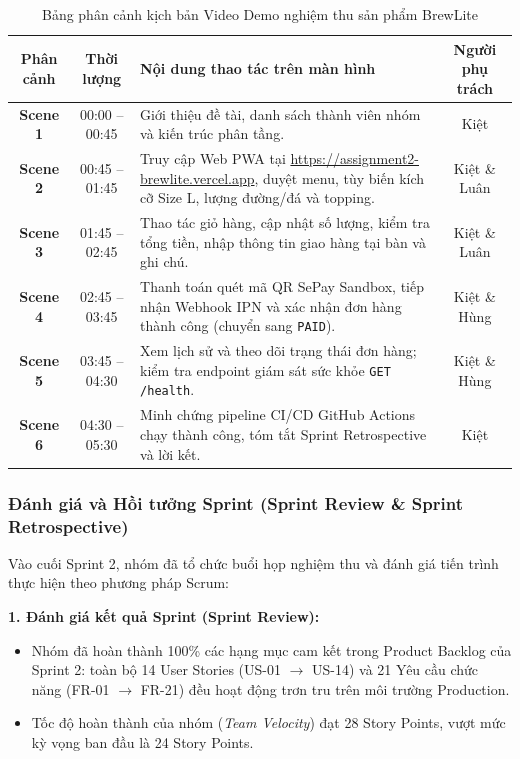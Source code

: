 \documentclass[a4paper]{article}
\begin{document}
\begin{table}[H]
\centering
\small
\begin{tabularx}{\textwidth}{|c|c|X|c|}
\hline
\textbf{Phân cảnh} & \textbf{Thời lượng} & \textbf{Nội dung thao tác trên màn hình} & \textbf{Người phụ trách} \\
\hline
\textbf{Scene 1} & 00:00 -- 00:45 & Giới thiệu đề tài, danh sách thành viên nhóm và kiến trúc phân tầng. & Kiệt \\
\hline
\textbf{Scene 2} & 00:45 -- 01:45 & Truy cập Web PWA tại \url{https://assignment2-brewlite.vercel.app}, duyệt menu, tùy biến kích cỡ Size L, lượng đường/đá và topping. & Kiệt \& Luân \\
\hline
\textbf{Scene 3} & 01:45 -- 02:45 & Thao tác giỏ hàng, cập nhật số lượng, kiểm tra tổng tiền, nhập thông tin giao hàng tại bàn và ghi chú. & Kiệt \& Luân \\
\hline
\textbf{Scene 4} & 02:45 -- 03:45 & Thanh toán quét mã QR SePay Sandbox, tiếp nhận Webhook IPN và xác nhận đơn hàng thành công (chuyển sang \texttt{PAID}). & Kiệt \& Hùng \\
\hline
\textbf{Scene 5} & 03:45 -- 04:30 & Xem lịch sử và theo dõi trạng thái đơn hàng; kiểm tra endpoint giám sát sức khỏe \texttt{GET /health}. & Kiệt \& Hùng \\
\hline
\textbf{Scene 6} & 04:30 -- 05:30 & Minh chứng pipeline CI/CD GitHub Actions chạy thành công, tóm tắt Sprint Retrospective và lời kết. & Kiệt \\
\hline
\end{tabularx}
\caption{Bảng phân cảnh kịch bản Video Demo nghiệm thu sản phẩm BrewLite}
\label{tab:demo-script}
\end{table}

\subsubsection{Đánh giá và Hồi tưởng Sprint (Sprint Review \& Sprint Retrospective)}

Vào cuối Sprint 2, nhóm đã tổ chức buổi họp nghiệm thu và đánh giá tiến trình thực hiện theo phương pháp Scrum:

\noindent\textbf{1. Đánh giá kết quả Sprint (Sprint Review):}
\begin{itemize}
    \item Nhóm đã hoàn thành 100\% các hạng mục cam kết trong Product Backlog của Sprint 2: toàn bộ 14 User Stories (US-01 $\rightarrow$ US-14) và 21 Yêu cầu chức năng (FR-01 $\rightarrow$ FR-21) đều hoạt động trơn tru trên môi trường Production.
    \item Tốc độ hoàn thành của nhóm (\textit{Team Velocity}) đạt 28 Story Points, vượt mức kỳ vọng ban đầu là 24 Story Points.
\end{itemize}
\end{document}

